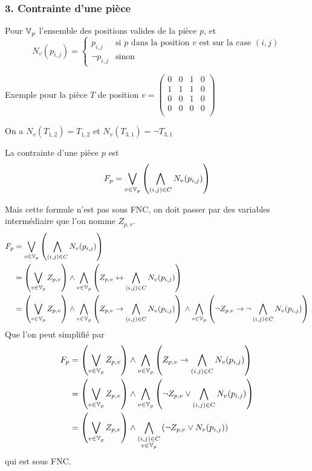     \subsubsection*{3. Contrainte d'une pièce}
    Pour $\mathbb{V}_p$ l'ensemble des positions valides de la pièce $p$,
    et
    \[N_v(p_{i,j}) = \begin{cases}
        p_{i,j} & \text{si $p$ dans la position $v$ est sur la case $(i,j)$}\\
        \lnot p_{i,j} & \text{sinon}
    \end{cases}\]
    
    Exemple pour la pièce $T$ de position $v =
    \begin{pmatrix}
        0 & 0 & 1 & 0 \\
        1 & 1 & 1 & 0 \\
        0 & 0 & 1 & 0 \\
        0 & 0 & 0 & 0 \\
    \end{pmatrix}$
    
    On a $N_v(T_{1,2}) = T_{1,2}$ et $N_v(T_{3,1}) = \lnot T_{3,1}$
    
    La contrainte d'une pièce $p$ est
    \[F_p = \bigvee_{v\in\mathbb{V}_p} \left( \bigwedge_{(i,j)\in C} N_v(p_{i,j}) \right)\]
    
    Mais cette formule n'est pas sous FNC,
    on doit passer par des variables intermédiaire que l'on nomme $Z_{p,v}$.
    \begin{align*}
        F_p &= \bigvee_{v\in\mathbb{V}_p} \left( \bigwedge_{(i,j)\in C} N_v(p_{i,j}) \right)\\
        &= \left( \bigvee_{v\in\mathbb{V}_p} Z_{p,v} \right)
            \land \bigwedge_{v\in\mathbb{V}_p} \left(Z_{p,v} \leftrightarrow \bigwedge_{(i,j)\in C} N_v(p_{i,j}) \right)\\
        &= \left( \bigvee_{v\in\mathbb{V}_p} Z_{p,v} \right)
            \land \bigwedge_{v\in\mathbb{V}_p} \left(Z_{p,v} \to \bigwedge_{(i,j)\in C} N_v(p_{i,j}) \right){}
            \land \bigwedge_{v\in\mathbb{V}_p} \left(\lnot Z_{p,v} \to \lnot\bigwedge_{(i,j)\in C} N_v(p_{i,j}) \right)\\
    \end{align*}
    Que l'on peut simplifié par
    \begin{align*}
        F_p &= \left( \bigvee_{v\in\mathbb{V}_p} Z_{p,v} \right)
            \land \bigwedge_{v\in\mathbb{V}_p} \left(Z_{p,v} \to \bigwedge_{(i,j)\in C} N_v(p_{i,j}) \right)\\
        &= \left( \bigvee_{v\in\mathbb{V}_p} Z_{p,v} \right)
            \land \bigwedge_{v\in\mathbb{V}_p} \left(\lnot Z_{p,v} \lor \bigwedge_{(i,j)\in C} N_v(p_{i,j}) \right)\\
        &= \left( \bigvee_{v\in\mathbb{V}_p} Z_{p,v} \right)
            \land \bigwedge_{\substack{(i,j)\in C\\v\in\mathbb{V}_p}} \left(\lnot Z_{p,v} \lor N_v(p_{i,j}) \right)\\
    \end{align*}
    qui est sous FNC.
    
